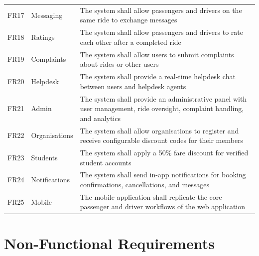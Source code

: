 \documentclass[12pt,a4paper,openright]{report}
\begin{document}
\begin{table}[H]
\begin{tabularx}{\textwidth}{l l X}
FR17 & Messaging & The system shall allow passengers and drivers on the same ride to exchange messages \\
FR18 & Ratings & The system shall allow passengers and drivers to rate each other after a completed ride \\
FR19 & Complaints & The system shall allow users to submit complaints about rides or other users \\
FR20 & Helpdesk & The system shall provide a real-time helpdesk chat between users and helpdesk agents \\
FR21 & Admin & The system shall provide an administrative panel with user management, ride oversight, complaint handling, and analytics \\
FR22 & Organisations & The system shall allow organisations to register and receive configurable discount codes for their members \\
FR23 & Students & The system shall apply a 50\% fare discount for verified student accounts \\
FR24 & Notifications & The system shall send in-app notifications for booking confirmations, cancellations, and messages \\
FR25 & Mobile & The mobile application shall replicate the core passenger and driver workflows of the web application \\
\bottomrule
\end{tabularx}
\end{table}

\section{Non-Functional Requirements}
\end{document}
